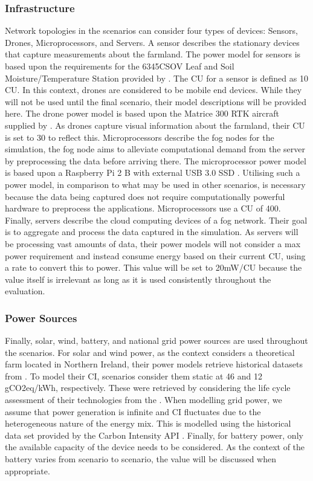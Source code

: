 \documentclass{l4proj}
\begin{document}
\subsubsection{Infrastructure}
Network topologies in the scenarios can consider four types of devices: Sensors, Drones, Microprocessors, and Servers.
A sensor describes the stationary devices that capture measurements about the farmland.
The power model for sensors is based upon the requirements for the 6345CSOV Leaf and Soil Moisture/Temperature Station provided by \cite{prodataWeatherSystems}.
The CU for a sensor is defined as 10 CU.
In this context, drones are considered to be mobile end devices. While they will not be used until the final scenario, their model descriptions will be provided here.
The drone power model is based upon the Matrice 300 RTK aircraft supplied by \cite{drone_spec}.
As drones capture visual information about the farmland, their CU is set to 30 to reflect this.
Microprocessors describe the fog nodes for the simulation, the fog node aims to alleviate computational demand from the server by preprocessing the data before arriving there.
The microprocessor power model is based upon a Raspberry Pi 2 B with external USB 3.0 SSD \citep{pidramble}.
Utilising such a power model, in comparison to what may be used in other scenarios, is necessary because the data being captured does not require computationally powerful hardware to preprocess the applications.
Microprocessors use a CU of 400.
Finally, servers describe the cloud computing devices of a fog network. Their goal is to aggregate and process the data captured in the simulation.
As servers will be processing vast amounts of data, their power models will not consider a max power requirement and instead consume energy based on their current CU, using a rate to convert this to power.
This value will be set to 20mW/CU because the value itself is irrelevant as long as it is used consistently throughout the evaluation.

\subsubsection{Power Sources}
Finally, solar, wind, battery, and national grid power sources are used throughout the scenarios.
For solar and wind power, as the context considers a theoretical farm located in Northern Ireland, their power models retrieve historical datasets from \cite{eirgrid}.
To model their CI, scenarios consider them static at 46 and 12 gCO2eq/kWh, respectively.
These were retrieved by considering the life cycle assessment of their technologies from the \cite{ipcc_synthesis_2014}.
When modelling grid power, we assume that power generation is infinite and CI fluctuates due to the heterogeneous nature of the energy mix.
This is modelled using the historical data set provided by the Carbon Intensity API \citep{carbon_intensity_api}.
Finally, for battery power, only the available capacity of the device needs to be considered.
As the context of the battery varies from scenario to scenario, the value will be discussed when appropriate.
\end{document}
